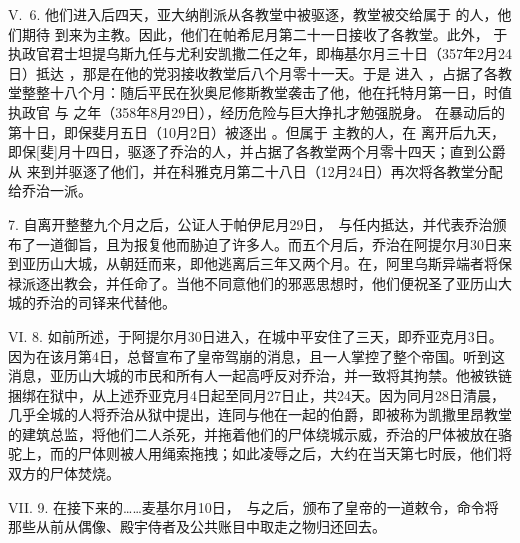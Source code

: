 V.~6. 他们进入后四天，亚大纳削派从各教堂中被驱逐，教堂被交给属于  的人，他们期待  到来为主教。因此，他们在帕希尼月第二十一日接收了各教堂。此外， 于执政官君士坦提乌斯九任与尤利安凯撒二任之年，即梅基尔月三十日（357年2月24日）抵达 ，那是在他的党羽接收教堂后八个月零十一天。于是  进入 ，占据了各教堂整整十八个月：随后平民在狄奥尼修斯教堂袭击了他，他在托特月第一日，时值执政官  与  之年（358年8月29日），经历危险与巨大挣扎才勉强脱身。 在暴动后的第十日，即保斐月五日（10月2日）被逐出 。但属于  主教的人，在  离开后九天，即保[斐]月十四日，驱逐了乔治的人，并占据了各教堂两个月零十四天；直到公爵  从  来到并驱逐了他们，并在科雅克月第二十八日（12月24日）再次将各教堂分配给乔治一派。\par

7. 自离开整整九个月之后，公证人于帕伊尼月29日，\ 与任内抵达，并代表乔治颁布了一道御旨，且为报复他而胁迫了许多人。而五个月后，乔治在阿提尔月30日来到亚历山大城，从朝廷而来，即他逃离后三年又两个月。在，阿里乌斯异端者将保禄派逐出教会，并任命了。当他不同意他们的邪恶思想时，他们便祝圣了亚历山大城的乔治的司铎来代替他。\par

VI. 8. 如前所述，于阿提尔月30日进入，在城中平安住了三天，即乔亚克月3日。因为在该月第4日，总督宣布了皇帝驾崩的消息，且一人掌控了整个帝国。听到这消息，亚历山大城的市民和所有人一起高呼反对乔治，并一致将其拘禁。他被铁链捆绑在狱中，从上述乔亚克月4日起至同月27日止，共24天。因为同月28日清晨，几乎全城的人将乔治从狱中提出，连同与他在一起的伯爵，即被称为凯撒里昂教堂的建筑总监，将他们二人杀死，并拖着他们的尸体绕城示威，乔治的尸体被放在骆驼上，而的尸体则被人用绳索拖拽；如此凌辱之后，大约在当天第七时辰，他们将双方的尸体焚烧。\par

VII. 9. 在接下来的……麦基尔月10日，\ 与之后，颁布了皇帝的一道敕令，命令将那些从前从偶像、殿宇侍者及公共账目中取走之物归还回去。\par


